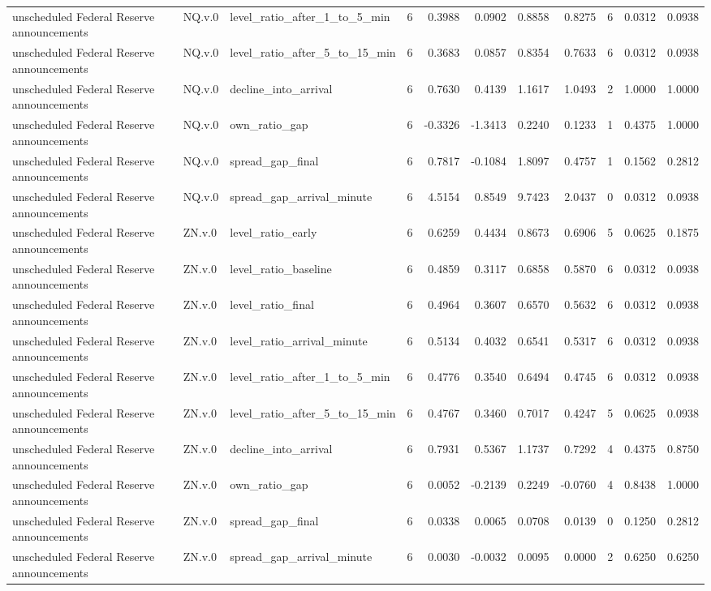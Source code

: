 \begin{tabular}{lllrrrrrrrr}
unscheduled Federal Reserve announcements & NQ.v.0 & level_ratio_after_1_to_5_min & 6 & 0.3988 & 0.0902 & 0.8858 & 0.8275 & 6 & 0.0312 & 0.0938 \\
unscheduled Federal Reserve announcements & NQ.v.0 & level_ratio_after_5_to_15_min & 6 & 0.3683 & 0.0857 & 0.8354 & 0.7633 & 6 & 0.0312 & 0.0938 \\
unscheduled Federal Reserve announcements & NQ.v.0 & decline_into_arrival & 6 & 0.7630 & 0.4139 & 1.1617 & 1.0493 & 2 & 1.0000 & 1.0000 \\
unscheduled Federal Reserve announcements & NQ.v.0 & own_ratio_gap & 6 & -0.3326 & -1.3413 & 0.2240 & 0.1233 & 1 & 0.4375 & 1.0000 \\
unscheduled Federal Reserve announcements & NQ.v.0 & spread_gap_final & 6 & 0.7817 & -0.1084 & 1.8097 & 0.4757 & 1 & 0.1562 & 0.2812 \\
unscheduled Federal Reserve announcements & NQ.v.0 & spread_gap_arrival_minute & 6 & 4.5154 & 0.8549 & 9.7423 & 2.0437 & 0 & 0.0312 & 0.0938 \\
unscheduled Federal Reserve announcements & ZN.v.0 & level_ratio_early & 6 & 0.6259 & 0.4434 & 0.8673 & 0.6906 & 5 & 0.0625 & 0.1875 \\
unscheduled Federal Reserve announcements & ZN.v.0 & level_ratio_baseline & 6 & 0.4859 & 0.3117 & 0.6858 & 0.5870 & 6 & 0.0312 & 0.0938 \\
unscheduled Federal Reserve announcements & ZN.v.0 & level_ratio_final & 6 & 0.4964 & 0.3607 & 0.6570 & 0.5632 & 6 & 0.0312 & 0.0938 \\
unscheduled Federal Reserve announcements & ZN.v.0 & level_ratio_arrival_minute & 6 & 0.5134 & 0.4032 & 0.6541 & 0.5317 & 6 & 0.0312 & 0.0938 \\
unscheduled Federal Reserve announcements & ZN.v.0 & level_ratio_after_1_to_5_min & 6 & 0.4776 & 0.3540 & 0.6494 & 0.4745 & 6 & 0.0312 & 0.0938 \\
unscheduled Federal Reserve announcements & ZN.v.0 & level_ratio_after_5_to_15_min & 6 & 0.4767 & 0.3460 & 0.7017 & 0.4247 & 5 & 0.0625 & 0.0938 \\
unscheduled Federal Reserve announcements & ZN.v.0 & decline_into_arrival & 6 & 0.7931 & 0.5367 & 1.1737 & 0.7292 & 4 & 0.4375 & 0.8750 \\
unscheduled Federal Reserve announcements & ZN.v.0 & own_ratio_gap & 6 & 0.0052 & -0.2139 & 0.2249 & -0.0760 & 4 & 0.8438 & 1.0000 \\
unscheduled Federal Reserve announcements & ZN.v.0 & spread_gap_final & 6 & 0.0338 & 0.0065 & 0.0708 & 0.0139 & 0 & 0.1250 & 0.2812 \\
unscheduled Federal Reserve announcements & ZN.v.0 & spread_gap_arrival_minute & 6 & 0.0030 & -0.0032 & 0.0095 & 0.0000 & 2 & 0.6250 & 0.6250 \\
\bottomrule
\end{tabular}
